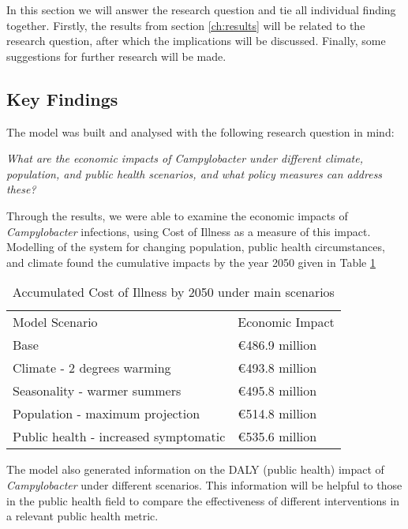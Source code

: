 In this section we will answer the research question and tie all individual finding together. Firstly, the results from section \ref{ch:results} will be related to the research question, after which the implications will be discussed. Finally, some suggestions for further research will be made. 

\subsection{Key Findings}

The model was built and analysed with the following research question in mind: 

\begin{center}\textit{\textcolor{NiceBlue}{
What are the economic impacts of Campylobacter under different climate, population, and public health scenarios, and what policy measures can address these? }}
\end{center}



Through the results, we were able to examine the economic impacts of \textit{Campylobacter} infections, using Cost of Illness as a measure of this impact. Modelling of the system for changing population, public health circumstances, and climate found the cumulative impacts by the year 2050 given in Table \ref{tab:coi_conclusion}

\begin{table}[h!]
\caption{Accumulated Cost of Illness by 2050 under main scenarios}
\label{tab:coi_conclusion}
\centering
\begin{tabular}{ll}
Model Scenario                        & Economic Impact  \\
Base                                  & €486.9 million           \\
Climate - 2 degrees warming           & €493.8 million           \\
Seasonality - warmer summers          & €495.8 million           \\
Population - maximum projection       & €514.8 million 			\\
Public health - increased symptomatic & €535.6 million 
\end{tabular}
\end{table}

The model also generated information on the DALY (public health) impact of \textit{Campylobacter} under different scenarios. This information will be helpful to those in the public health field to compare the effectiveness of different interventions in a relevant public health metric.

